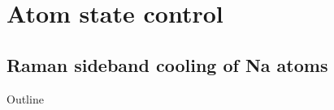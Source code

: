 \documentclass{beamer}
\begin{document}
\section{Atom state control}
\subsection{Raman sideband cooling of Na atoms}
\begin{frame}{Outline}
\end{frame}


\end{document}
